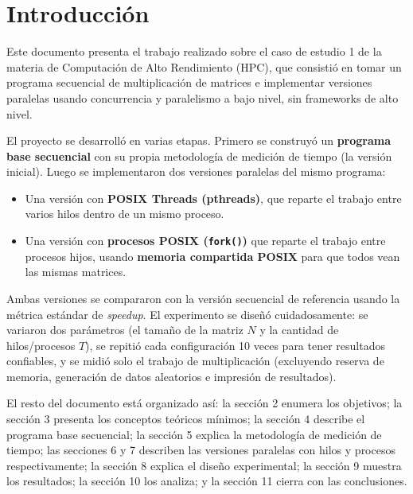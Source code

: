 \section{Introducción}

Este documento presenta el trabajo realizado sobre el caso de estudio 1 de la materia de Computación de Alto Rendimiento (HPC), que consistió en tomar un programa secuencial de multiplicación de matrices e implementar versiones paralelas usando concurrencia y paralelismo a bajo nivel, sin frameworks de alto nivel.

El proyecto se desarrolló en varias etapas. Primero se construyó un \textbf{programa base secuencial} con su propia metodología de medición de tiempo (la versión inicial). Luego se implementaron dos versiones paralelas del mismo programa:

\begin{itemize}
    \item Una versión con \textbf{POSIX Threads (pthreads)}, que reparte el trabajo entre varios hilos dentro de un mismo proceso.
    \item Una versión con \textbf{procesos POSIX (\texttt{fork()})} que reparte el trabajo entre procesos hijos, usando \textbf{memoria compartida POSIX} para que todos vean las mismas matrices.
\end{itemize}

Ambas versiones se compararon con la versión secuencial de referencia usando la métrica estándar de \textit{speedup}. El experimento se diseñó cuidadosamente: se variaron dos parámetros (el tamaño de la matriz $N$ y la cantidad de hilos/procesos $T$), se repitió cada configuración 10 veces para tener resultados confiables, y se midió solo el trabajo de multiplicación (excluyendo reserva de memoria, generación de datos aleatorios e impresión de resultados).

El resto del documento está organizado así: la sección 2 enumera los objetivos; la sección 3 presenta los conceptos teóricos mínimos; la sección 4 describe el programa base secuencial; la sección 5 explica la metodología de medición de tiempo; las secciones 6 y 7 describen las versiones paralelas con hilos y procesos respectivamente; la sección 8 explica el diseño experimental; la sección 9 muestra los resultados; la sección 10 los analiza; y la sección 11 cierra con las conclusiones.